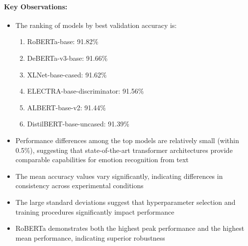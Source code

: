\documentclass[12pt]{article}
\begin{document}
\paragraph{Key Observations:}
\begin{itemize}
    \item The ranking of models by best validation accuracy is:
    \begin{enumerate}
        \item RoBERTa-base: 91.82\%
        \item DeBERTa-v3-base: 91.66\%
        \item XLNet-base-cased: 91.62\%
        \item ELECTRA-base-discriminator: 91.56\%
        \item ALBERT-base-v2: 91.44\%
        \item DistilBERT-base-uncased: 91.39\%
    \end{enumerate}
    
    \item Performance differences among the top models are relatively small (within 0.5\%), suggesting that state-of-the-art transformer architectures provide comparable capabilities for emotion recognition from text
    
    \item The mean accuracy values vary significantly, indicating differences in consistency across experimental conditions
    
    \item The large standard deviations suggest that hyperparameter selection and training procedures significantly impact performance
    
    \item RoBERTa demonstrates both the highest peak performance and the highest mean performance, indicating superior robustness
\end{itemize}
\end{document}
